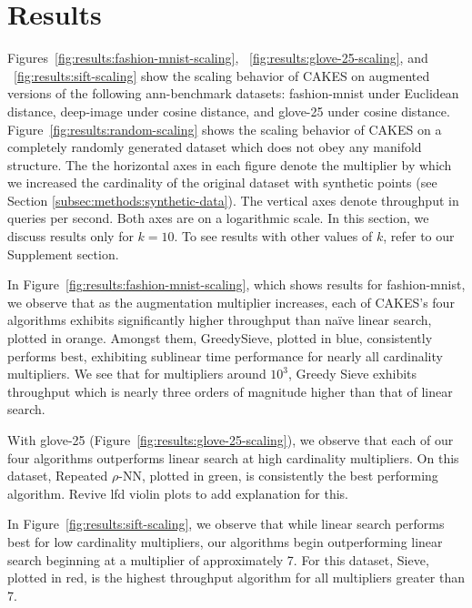 \section{Results}
\label{sec:results}


Figures~\ref{fig:results:fashion-mnist-scaling}, ~\ref{fig:results:glove-25-scaling}, and ~\ref{fig:results:sift-scaling} show the scaling behavior of CAKES on augmented versions of the following ann-benchmark datasets: fashion-mnist under Euclidean distance, deep-image under cosine distance, and glove-25 under cosine distance. 
Figure~\ref{fig:results:random-scaling} shows the scaling behavior of CAKES on a completely randomly generated dataset which does not obey any manifold structure. 
The the horizontal axes in each figure denote the multiplier by which we increased the cardinality of the original dataset with synthetic points (see Section \ref{subsec:methods:synthetic-data}). 
The vertical axes denote throughput in queries per second. Both axes are on a logarithmic scale. In this section, we discuss results only for $k = 10$. 
To see results with other values of $k$, refer to our Supplement section.

In Figure~\ref{fig:results:fashion-mnist-scaling}, which shows results for fashion-mnist, we observe that as the augmentation multiplier increases, each of CAKES's four algorithms exhibits significantly higher throughput than na\"{i}ve linear search, plotted in orange. 
Amongst them, GreedySieve, plotted in blue, consistently performs best, exhibiting sublinear time performance for nearly all cardinality multipliers. 
We see that for multipliers around $10^3$, Greedy Sieve exhibits throughput which is nearly three orders of magnitude higher than that of linear search.


With glove-25 (Figure~\ref{fig:results:glove-25-scaling}), we observe that each of our four algorithms outperforms linear search at high cardinality multipliers. 
On this dataset, Repeated $\rho$-NN, plotted in green, is consistently the best performing algorithm. {\color{red} Revive lfd violin plots to add explanation for this.}


In Figure~\ref{fig:results:sift-scaling}, we observe that while linear search performs best for low cardinality multipliers, our algorithms begin outperforming linear search beginning at a multiplier of approximately 7. 
For this dataset, Sieve, plotted in red, is the highest throughput algorithm for all multipliers greater than 7. 

